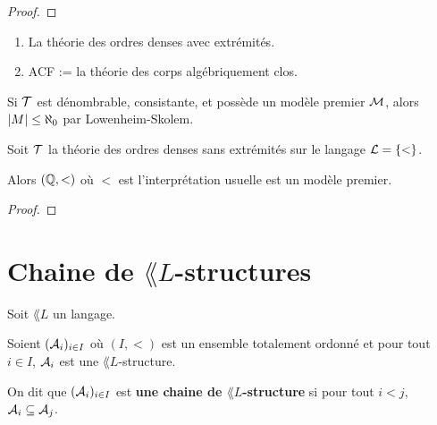 \documentclass[a4paper, 12pt]{report}
\begin{document}
\ifdefined\outputproof
\begin{proof}



\end{proof}
\fi

\begin{exemple}
	\begin{enumerate}
		\item La théorie des ordres denses avec extrémités.
		\item ACF := la théorie des corps algébriquement clos.
	\end{enumerate}
\end{exemple}

\begin{remarque}
	Si $\mathcal{T}$ est dénombrable, consistante, et possède un modèle premier
	$\mathcal{M}$, alors $|M| \leq \aleph_{0}$ par Lowenheim-Skolem.
\end{remarque}

\begin{proposition}
	Soit $\mathcal{T}$ la théorie des ordres denses sans extrémités sur le
	langage $\mathcal{L} = \left\{ < \right\}$.

	Alors $(\mathbb{Q}, <)$ où $<$ est l'interprétation usuelle est un modèle premier.
\end{proposition}

\ifdefined\outputproof
\begin{proof}

\end{proof}
\fi

\chapter{Chaine de $\lang{L}$-structures}

\begin{definition} 
	Soit $\lang{L}$ un langage.

	Soient $(\mathcal{A}_{i})_{i \in I}$ où $(I, <)$ est un ensemble totalement
	ordonné et pour tout $i \in I$, $\mathcal{A}_{i}$ est une $\lang{L}$-structure.

	On dit que $(\mathcal{A}_{i})_{i \in I}$ est \textbf{une chaine de
		$\lang{L}$-structure} si pour tout $i < j$, $\mathcal{A}_{i} \subseteq
	\mathcal{A}_{j}$.
\end{definition}
\end{document}
